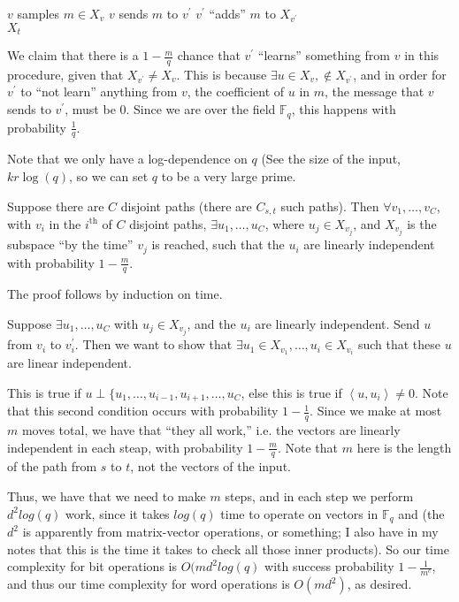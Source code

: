 \documentclass[11pt]{article}
\newcommand{\F}{\mathbb{F}}
\begin{document}
\begin{algorithm}[H]
\begin{algorithmic}
    \State $v$ samples $m \in X_v$
    \State $v$ sends $m$ to $v^\prime$
    \State $v^\prime$ ``adds'' $m$ to $X_{v^\prime}$
  \EndFor \\
  \Return $X_t$
\EndFunction
\end{algorithmic}
\end{algorithm}

We claim that there is a $1 - \frac{m}{q}$ chance that $v^\prime$ ``learns'' something from $v$ in this
procedure, given that $X_{v^\prime} \neq X_v$. This is because $\exists u\in X_v, \notin X_{v^\prime}$,
and in order for $v^\prime$ to ``not learn'' anything from $v$, the coefficient of $u$ in $m$, the message 
that $v$ sends to $v^\prime$, must be 0. Since we are over the field $\F_q$, this happens with probability
$\frac{1}{q}$.

Note that we only have a log-dependence on $q$ (See the size of the input, $kr\log(q)$, so we can set 
$q$ to be a very large prime.

Suppose there are $C$ disjoint paths (there are $C_{s,t}$ such paths). Then $\forall v_1, \ldots, v_C$,
with $v_i$ in the $i^{\text{th}}$ of $C$ disjoint paths, $\exists u_1, \ldots, u_C$, where $u_j \in X_{v_j}$,
and $X_{v_j}$ is the subspace ``by the time'' $v_j$ is reached, such that the $u_i$ are linearly independent
with probability $1 - \frac{m}{q}$.

The proof follows by induction on time. 

Suppose $\exists u_1, \ldots, u_C$ with $u_j \in X_{v_j}$, and the $u_i$ are linearly independent. 
Send $u$ from $v_i$ to $v_i^\prime$. Then we want to show that $\exists u_1 \in X_{v_1}, \ldots, u_i \in
X_{v_i}$ such that these $u$ are linear independent. 

This is true if $u \perp \{u_1, \ldots, u_{i-1}, u_{i+1}, \ldots, u_C$, else this is true if
$\left<u, u_i\right> \neq 0$. Note that this second condition occurs with probability $1 - \frac{1}{q}$.
Since we make at most $m$ moves total, we have that ``they all work,'' i.e. the vectors are linearly 
independent in each steap, with probability $1 - \frac{m}{q}$. Note that $m$ here is the length of the
path from $s$ to $t$, not the vectors of the input.

Thus, we have that we need to make $m$ steps, and in each step we perform $d^2log(q)$ work, since it 
takes $log(q)$ time to operate on vectors in $\F_q$ and (the $d^2$ is apparently from matrix-vector operations,
or something; I also have in my notes that this is the time it takes to check all those inner products).
So our time complexity for bit operations is $O(md^2log(q)$ with success probability $1 - \frac{1}{m^c}$,
and thus our time complexity for word operations is $O(md^2)$, as desired.
\end{document}
